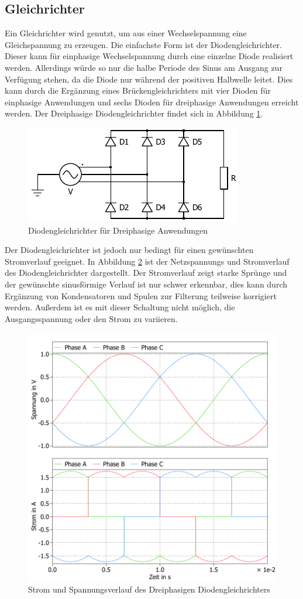 		\subsection{Gleichrichter}
		\label{sec:Rec}
		Ein Gleichrichter wird genutzt, um aus einer Wechselspannung eine Gleichspannung zu erzeugen. Die einfachste Form ist der Diodengleichrichter. Dieser kann für einphasige Wechselspannung durch eine einzelne Diode realisiert werden. Allerdings würde so nur die halbe Periode des Sinus am Ausgang zur Verfügung stehen, da die Diode nur während der positiven Halbwelle leitet. Dies kann durch die Ergänzung eines Brückengleichrichters mit vier Dioden für einphasige Anwendungen und sechs Dioden für dreiphasige Anwendungen erreicht werden. Der Dreiphasige Diodengleichrichter findet sich in Abbildung \ref{fig:B6DiodRect}.\\
		\begin{figure}
			\centering
			\includegraphics[width=0.8\linewidth]{content/Grafiken/Plecs_Diodengleichrichter.pdf}
			\caption{Diodengleichrichter für Dreiphasige Anwendungen}
			\label{fig:B6DiodRect}
		\end{figure}
		Der Diodengleichrichter ist jedoch nur bedingt für einen gewünschten Stromverlauf geeignet. In Abbildung \ref{fig:B6DiodRectI} ist der Netzspannungs und Stromverlauf des Diodengleichrichter dargestellt. Der Stromverlauf zeigt starke Sprünge und der gewünschte sinusförmige Verlauf ist nur schwer erkennbar, dies kann durch Ergänzung von Kondensatoren und Spulen zur Filterung teilweise korrigiert werden. Außerdem ist es mit dieser Schaltung nicht möglich, die Ausgangsspannung oder den Strom zu variieren.\\
		\begin{figure}
			\centering
			\includegraphics[width=0.68\linewidth]{content/Grafiken/B6-Diodengleichrichter-Eingangsverlauf}
			\caption{Strom und Spannungsverlauf des Dreiphasigen Diodengleichrichters }
			\label{fig:B6DiodRectI}
		\end{figure}
